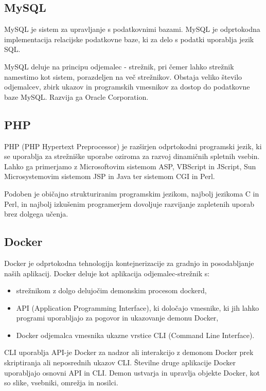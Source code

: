 \documentclass[a4paper,12pt,openright,oneside]{book}
\begin{document}
\subsection{MySQL}
MySQL je sistem za upravljanje s podatkovnimi bazami. MySQL je odprtokodna implementacija relacijske podatkovne baze, ki za delo s podatki uporablja jezik SQL.

MySQL deluje na principu odjemalec - strežnik, pri čemer lahko strežnik namestimo kot sistem, porazdeljen na več strežnikov. Obstaja veliko število odjemalcev, zbirk ukazov in programskih vmesnikov za dostop do podatkovne baze MySQL. Razvija ga Oracle Corporation. 

\subsection{PHP}
PHP \cite{php} (PHP Hypertext Preprocessor) je razširjen odprtokodni programski jezik, ki se uporablja za strežniške uporabe oziroma za razvoj dinamičnih spletnih vsebin. Lahko ga primerjamo z Microsoftovim sistemom ASP, VBScript in JScript, Sun Microsystemovim sistemom JSP in Java ter sistemom CGI in Perl.

Podoben je običajno strukturiranim programskim jezikom, najbolj jezikoma C in Perl, in najbolj izkušenim programerjem dovoljuje razvijanje zapletenih uporab brez dolgega učenja. 

\subsection{Docker}
Docker \cite{dockerLink} je odprtokodna tehnologija kontejnerizacije za gradnjo in posodabljanje naših aplikacij.
Docker deluje kot aplikacija odjemalec-strežnik s:
\begin{itemize}
    \item strežnikom z dolgo delujočim demonskim procesom dockerd,
    \item API (Application Programming Interface), ki določajo vmesnike, ki jih lahko programi uporabljajo za pogovor in ukazovanje demonu Docker,
    \item Docker odjemalca vmesnika ukazne vrstice CLI (Command Line Interface).
\end{itemize}
CLI uporablja API-je Docker za nadzor ali interakcijo z demonom Docker prek skriptiranja ali neposrednih ukazov CLI. Številne druge aplikacije Docker uporabljajo osnovni API in CLI. Demon ustvarja in upravlja objekte Docker, kot so slike, vsebniki, omrežja in nosilci.
\end{document}
